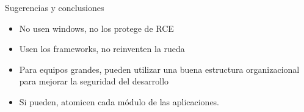 \documentclass{beamer}
\begin{document}
\begin{frame}{Sugerencias y conclusiones }
    \centering
    \begin{itemize}
        \item No usen windows, no los protege de RCE
        \item Usen los frameworks, no reinventen la rueda
        \item Para equipos grandes, pueden utilizar una buena estructura organizacional para mejorar la seguridad del desarrollo
        \item Si pueden, atomicen cada módulo de las aplicaciones. 
    \end{itemize}
\end{frame}

\begin{frame}
    \titlepage
\end{frame}
\end{document}
